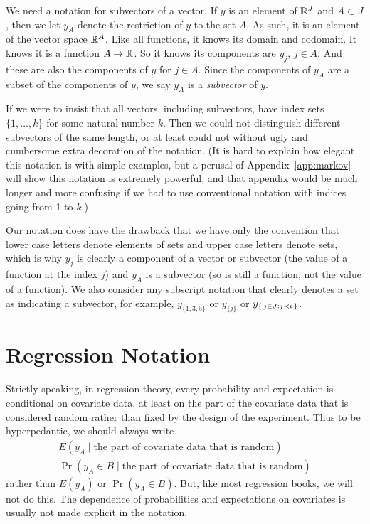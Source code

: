 We need a notation for subvectors of a vector.  If $y$ is an element
of $\mathbb{R}^J$ and $A \subset J$, then we let $y_A$ denote the restriction
of $y$ to the set $A$.
As such, it is an element of the vector space $\mathbb{R}^A$.
Like all functions, it knows its domain and codomain.
It knows it is a function $A \to \mathbb{R}$.
So it knows its components are $y_j$, $j \in A$.
And these are also the components of $y$ for $j \in A$.
Since the components of $y_A$ are a subset of the components of $y$,
we say $y_A$ is a \emph{subvector} of $y$.

If we were to insist that all vectors, including subvectors, have
index sets $\{1, \ldots, k\}$ for some natural number $k$.  Then we could
not distinguish different subvectors of the same length, or at least could
not without ugly and cumbersome extra decoration of the notation.
(It is hard to explain how elegant this notation is with simple examples,
but a perusal of Appendix~\ref{app:markov} will show this notation is
extremely powerful, and that appendix would be much longer and more confusing
if we had to use conventional notation with indices going from 1 to $k$.)

Our notation does have the drawback that we have only the convention
that lower case letters denote elements of sets and upper case letters
denote sets, which is why $y_j$ is clearly a component of a vector or subvector
(the value of a function at the index $j$) and $y_A$ is a subvector
(so is still a function, not the value of a function).
We also consider any subscript notation that clearly denotes a set
as indicating a subvector, for example, $y_{\{1, 3, 5\}}$ or $y_{\{j\}}$ or
$y_{\{\,  j \in J : j \prec i  \,\}}$.

\section{Regression Notation}

Strictly speaking, in regression theory, every probability and expectation
is conditional on covariate data, at least on the part of the covariate data
that is considered random rather than fixed by the design of the experiment.
Thus to be hyperpedantic, we should always write
\begin{gather*}
   E(y_A \mid \text{the part of covariate data that is random})
   \\
   \Pr(y_A \in B \mid \text{the part of covariate data that is random})
\end{gather*}
rather than $E(y_A)$ or $\Pr(y_A \in B)$.  But, like most regression books,
we will not do this.  The dependence of probabilities and expectations on
covariates is usually not made explicit in the notation.

